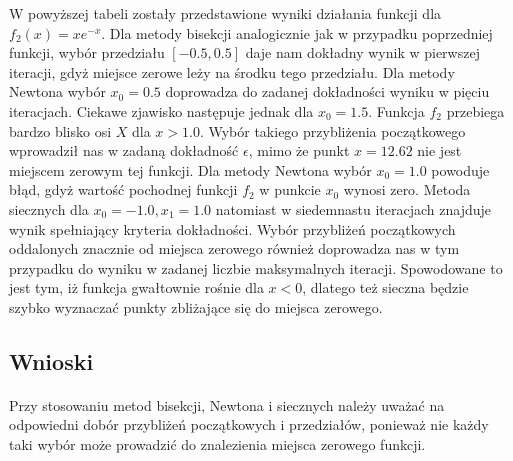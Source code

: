 \documentclass[a4paper]{article}
\begin{document}
W powyższej tabeli zostały przedstawione wyniki działania funkcji dla $f_{2}(x) = xe^{-x}$. Dla metody bisekcji analogicznie jak w przypadku poprzedniej funkcji, wybór przedziału $[-0.5, 0.5]$ daje nam dokładny wynik w pierwszej iteracji, gdyż miejsce zerowe leży na środku tego przedziału. Dla metody Newtona wybór $x_{0} = 0.5$ doprowadza do zadanej dokładności wyniku w pięciu iteracjach. Ciekawe zjawisko następuje jednak dla  $x_{0} = 1.5$. Funkcja $f_{2}$ przebiega bardzo blisko osi $X$ dla $x > 1.0$. Wybór takiego przybliżenia początkowego wprowadził nas w zadaną dokładność $\epsilon$, mimo że punkt $x = 12.62$ nie jest miejscem zerowym tej funkcji. Dla metody Newtona wybór $x_{0} = 1.0$ powoduje błąd, gdyż wartość pochodnej funkcji $f_{2}$ w punkcie $x_{0}$ wynosi zero. Metoda siecznych dla $x_{0} = -1.0, x_{1} = 1.0$ natomiast w siedemnastu iteracjach znajduje wynik spełniający kryteria dokładności. Wybór przybliżeń początkowych oddalonych znacznie od miejsca zerowego również doprowadza nas w tym przypadku do wyniku w zadanej liczbie maksymalnych iteracji. Spowodowane to jest tym, iż funkcja gwałtownie rośnie dla $x < 0$, dlatego też sieczna będzie szybko wyznaczać punkty zbliżające się do miejsca zerowego.

\subsection{Wnioski}
\paragraph{}
Przy stosowaniu metod bisekcji, Newtona i siecznych należy uważać na odpowiedni dobór przybliżeń początkowych i przedziałów, ponieważ nie każdy taki wybór może prowadzić do znalezienia miejsca zerowego funkcji.
\end{document}
